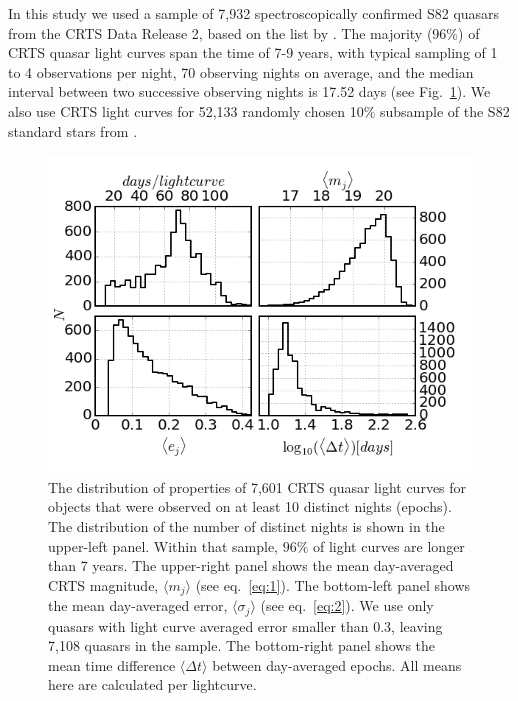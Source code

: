 \documentclass[fleqn,usenatbib]{mnras}
\begin{document}
In this study we used a sample of 7,932 spectroscopically confirmed S82 quasars from the CRTS Data Release 2, based 
on the list by \cite{macleod2012}.  The majority (96\%) of  CRTS quasar light curves span the time of 7-9 years, 
with typical sampling of 1 to 4 observations per night, 70 observing nights on average, and the 
median interval between two successive observing nights is 17.52  days (see Fig.~\ref{fig:1}). We also use CRTS light curves for 52,133 randomly chosen 10\% subsample of the S82 
standard stars from \cite{ivezic2007}. 
\begin{figure}
\vskip -0.2in
\includegraphics[width=1.04\columnwidth]{Fig_1_QSO_CRTS_proc_stats.png}
\vskip -0.1in
\caption{The distribution of properties of 7,601 CRTS quasar light curves for objects that were observed 
on at least 10 distinct nights (epochs). The  distribution of the number of distinct nights is shown in the 
upper-left panel. Within that sample, $96\%$ of light curves are longer than 7 years.  The upper-right panel 
shows the mean day-averaged CRTS magnitude, $\langle  m_{j} \rangle$ (see eq.~\ref{eq:1}). 
The bottom-left panel shows the  mean day-averaged error, $\langle \sigma_{j} \rangle$ (see eq.~\ref{eq:2}). 
We use only quasars with light curve averaged error smaller than 0.3, leaving 7,108 quasars in the sample.
The bottom-right panel shows the mean time difference $\langle \Delta t \rangle$ between day-averaged epochs. 
All means here are calculated per lightcurve. }
\label{fig:1}
\end{figure}
\end{document}
